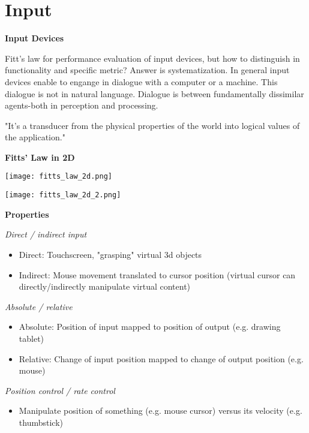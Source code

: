 \section{Input}

\textbf{Input Devices}

Fitt's law for performance evaluation of input devices, but how to distinguish in functionality and specific metric? Answer is systematization. 
In general input devices enable to engange in dialogue with a computer or a machine. This dialogue is not in natural language. 
Dialogue is between fundamentally dissimilar agents-both in perception and processing. \medskip

"It's a transducer from the physical properties of the world into logical values of the application." \medskip

\textbf{Fitts' Law in 2D}

\begin{center}
	\texttt{[image: fitts\_law\_2d.png]}
\end{center}

\begin{center}
	\texttt{[image: fitts\_law\_2d\_2.png]}
\end{center}

\textbf{Properties} \smallskip

\textit{Direct / indirect input} \smallskip

\begin{itemize}[itemsep=-5pt, topsep=0pt, leftmargin=*]
	\item Direct: Touchscreen, "grasping" virtual 3d objects
	\item Indirect: Mouse movement translated to cursor position (virtual cursor can directly/indirectly manipulate virtual content)
\end{itemize}

\textit{Absolute / relative} \smallskip

\begin{itemize}[itemsep=-5pt, topsep=0pt, leftmargin=*]
	\item Absolute: Position of input mapped to position of output (e.g. drawing tablet)
	\item Relative: Change of input position mapped to change of output position (e.g. mouse)
\end{itemize}


\textit{Position control / rate control} \smallskip


\begin{itemize}[itemsep=-5pt, topsep=0pt, leftmargin=*]
	\item Manipulate position of something (e.g. mouse cursor) versus its velocity (e.g. thumbstick)
\end{itemize} \medskip

